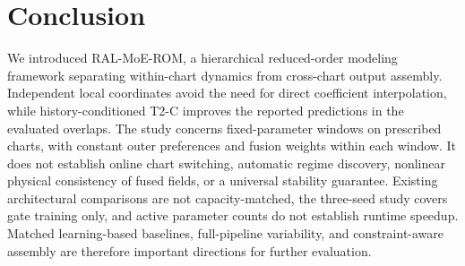 \section{Conclusion}

We introduced RAL-MoE-ROM, a hierarchical reduced-order modeling framework separating within-chart dynamics from cross-chart output assembly. Independent local coordinates avoid the need for direct coefficient interpolation, while history-conditioned T2-C improves the reported predictions in the evaluated overlaps. The study concerns fixed-parameter windows on prescribed charts, with constant outer preferences and fusion weights within each window. It does not establish online chart switching, automatic regime discovery, nonlinear physical consistency of fused fields, or a universal stability guarantee. Existing architectural comparisons are not capacity-matched, the three-seed study covers gate training only, and active parameter counts do not establish runtime speedup. Matched learning-based baselines, full-pipeline variability, and constraint-aware assembly are therefore important directions for further evaluation.

